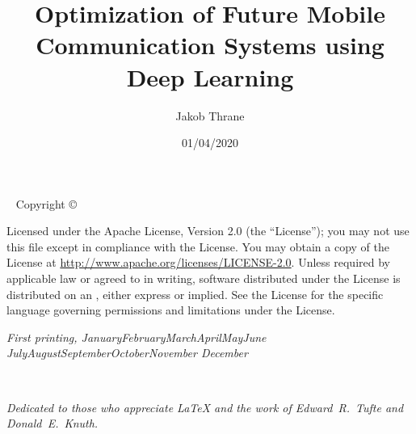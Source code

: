 \documentclass[nobib, b5paper]{tufte-book}
\title{Optimization of Future Mobile Communication Systems using Deep Learning}
\date{01/04/2020}
\author[Jakob Thrane]{Jakob Thrane}
\newcommand{\monthyear}{%
  \ifcase\month\or January\or February\or March\or April\or May\or June\or
  July\or August\or September\or October\or November\or
  December\fi\space\number\year
}
\newcommand{\blankpage}{\newpage\hbox{}\thispagestyle{empty}\newpage}
\begin{document}
\frontmatter





\newpage
\begin{fullwidth}
~\vfill
\thispagestyle{empty}
\setlength{\parindent}{0pt}
\setlength{\parskip}{\baselineskip}
Copyright \copyright\ \the\year\ \thanklessauthor

\par{}

\par{}

\par Licensed under the Apache License, Version 2.0 (the ``License''); you may not
use this file except in compliance with the License. You may obtain a copy
of the License at \url{http://www.apache.org/licenses/LICENSE-2.0}. Unless
required by applicable law or agreed to in writing, software distributed
under the License is distributed on an , either express or implied. See the
License for the specific language governing permissions and limitations
under the License.

\par\textit{First printing, \monthyear}
\end{fullwidth}





\printglossary[type=\acronymtype, nonumberlist, title=Acronyms]

\tableofcontents



\cleardoublepage
~\vfill
\begin{doublespace}
\noindent\fontsize{18}{22}\selectfont\itshape
\nohyphenation
Dedicated to those who appreciate \LaTeX{} 
and the work of \mbox{Edward R.~Tufte} 
and \mbox{Donald E.~Knuth}.
\end{doublespace}
\vfill
\vfill


\cleardoublepage



\mainmatter
\end{document}
